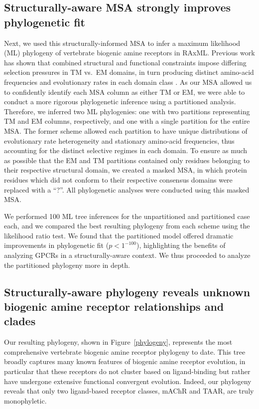 \documentclass[fleqn,10pt]{wlpeerj}
\begin{document}
\subsection*{Structurally-aware MSA strongly improves phylogenetic fit}

Next, we used this structurally-informed MSA to infer a maximum likelihood (ML) phylogeny of vertebrate biogenic amine receptors in RAxML. Previous work has shown that combined structural and functional constraints impose differing selection pressures in TM vs.\ EM domains, in turn producing distinct amino-acid frequencies and evolutionary rates in each domain class \citep{Tourasse2000,Stevens2001,Julenius2006,Oberai2009,SpielmanWilke2013,FranzosaXueXia2013}. As our MSA allowed us to confidently identify each MSA column as either TM or EM, we were able to conduct a more rigorous phylogenetic inference using a partitioned analysis. Therefore, we inferred two ML phylogenies: one with two partitions representing TM and EM columns, respectively, and one with a single partition for the entire MSA. The former scheme allowed each partition to have unique distributions of evolutionary rate heterogeneity and stationary amino-acid frequencies, thus accounting for the distinct selective regimes in each domain. To ensure as much as possible that the EM and TM partitions contained only residues belonging to their respective structural domain, we created a masked MSA, in which protein residues which did not conform to their respective consensus domains were replaced with a ``?''. All phylogenetic analyses were conducted using this masked MSA.

We performed 100 ML tree inferences for the unpartitioned and partitioned case each, and we compared the best resulting phylogeny from each scheme using the likelihood ratio test. We found that the partitioned model offered dramatic improvements in phylogenetic fit ($p < 1^{-100}$), highlighting the benefits of analyzing GPCRs in a structurally-aware context. We thus proceeded to analyze the partitioned phylogeny more in depth.


\subsection*{Structurally-aware phylogeny reveals unknown biogenic amine receptor relationships and clades}

Our resulting phylogeny, shown in Figure~\ref{phylogeny}, represents the most comprehensive vertebrate biogenic amine receptor phylogeny to date. This tree broadly captures many known features of biogenic amine receptor evolution, in particular that these receptors do not cluster based on ligand-binding but rather have undergone extensive functional convergent evolution. Indeed, our phylogeny reveals that only two ligand-based receptor classes, mAChR and TAAR, are truly monophyletic. 
\end{document}
